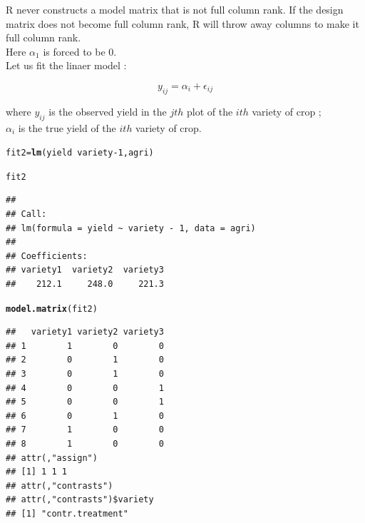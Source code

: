 \documentclass[11pt, a4paper]{article}\usepackage[]{graphicx}\usepackage[]{xcolor}
\makeatletter
\newcommand{\hlnum}[1]{\textcolor[rgb]{0.686,0.059,0.569}{#1}}%
\newcommand{\hlopt}[1]{\textcolor[rgb]{0,0,0}{#1}}%
\newcommand{\hlstd}[1]{\textcolor[rgb]{0.345,0.345,0.345}{#1}}%
\newcommand{\hlkwb}[1]{\textcolor[rgb]{0.69,0.353,0.396}{#1}}%
\newcommand{\hlkwd}[1]{\textcolor[rgb]{0.737,0.353,0.396}{\textbf{#1}}}%
\newenvironment{kframe}{%
 \def\at@end@of@kframe{}%
 \ifinner\ifhmode%
  \def\at@end@of@kframe{\end{minipage}}%
  \begin{minipage}{\columnwidth}%
 \fi\fi%
 \def\FrameCommand##1{\hskip\@totalleftmargin \hskip-\fboxsep
 \colorbox{shadecolor}{##1}\hskip-\fboxsep
     \hskip-\linewidth \hskip-\@totalleftmargin \hskip\columnwidth}%
 \MakeFramed {\advance\hsize-\width
   \@totalleftmargin\z@ \linewidth\hsize
   \@setminipage}}%
 {\par\unskip\endMakeFramed%
 \at@end@of@kframe}
\newenvironment{knitrout}{}{} %
\makeatother
\begin{document}
R never constructs a model matrix that is not full column rank. If the design matrix does not become full column rank, R will throw away columns to make it full column rank. \\

Here $\alpha_1$ is forced to be $0$. \\

Let us fit the linaer model :

$$y_{ij} = \alpha_i + \epsilon_{ij}$$

where $y_{ij}$ is the observed yield in the $jth$ plot of the $ith$ variety of crop ; \\

$\alpha_i$ is the true yield of the $ith$ variety of crop.

\begin{knitrout}
\color{fgcolor}\begin{kframe}
\begin{alltt}
\hlstd{fit2} \hlkwb{=} \hlkwd{lm}\hlstd{(yield} \hlopt{~} \hlstd{variety} \hlopt{-} \hlnum{1}\hlstd{, agri)}
\end{alltt}
\end{kframe}
\end{knitrout}

\begin{knitrout}
\color{fgcolor}\begin{kframe}
\begin{alltt}
\hlstd{fit2}
\end{alltt}
\begin{verbatim}
## 
## Call:
## lm(formula = yield ~ variety - 1, data = agri)
## 
## Coefficients:
## variety1  variety2  variety3  
##    212.1     248.0     221.3
\end{verbatim}
\end{kframe}
\end{knitrout}

\begin{knitrout}
\color{fgcolor}\begin{kframe}
\begin{alltt}
\hlkwd{model.matrix}\hlstd{(fit2)}
\end{alltt}
\begin{verbatim}
##   variety1 variety2 variety3
## 1        1        0        0
## 2        0        1        0
## 3        0        1        0
## 4        0        0        1
## 5        0        0        1
## 6        0        1        0
## 7        1        0        0
## 8        1        0        0
## attr(,"assign")
## [1] 1 1 1
## attr(,"contrasts")
## attr(,"contrasts")$variety
## [1] "contr.treatment"
\end{verbatim}
\end{kframe}
\end{knitrout}
\end{document}
